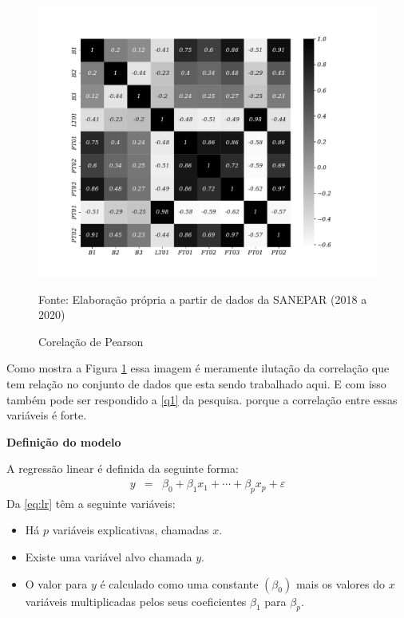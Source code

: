 \begin{figure}[H]
	\centering
	\caption{Corelação de Pearson }
	\label{fig:person}
	\includegraphics[width=1\linewidth]{Apendices/Figuras/modelagem-24h/person}
	
	Fonte: Elaboração própria a partir de dados da SANEPAR (2018 a 2020)
\end{figure}

Como mostra a Figura \ref{fig:person} essa imagem é meramente ilutação da correlação que tem relação no conjunto de dados que esta sendo trabalhado aqui. E com isso também pode ser respondido a \ref{q1} da pesquisa. porque a correlação entre essas variáveis é forte.

\textbf{Definição do modelo}

A regressão linear é definida da seguinte forma:
\begin{eqnarray}
y&=&\beta_0+\beta_1 x_1+\cdots+\beta_p x_p+\varepsilon\label{eq:lr}
\end{eqnarray}
Da \eqref{eq:lr} têm a seguinte variáveis:

\begin{itemize}
	\item  Há $p$ variáveis explicativas, chamadas $x$.
\item Existe uma variável alvo chamada $y$.
\item  O valor para $y$ é calculado como uma constante $\left(\beta_0\right)$ mais os valores do $x$ variáveis multiplicadas pelos seus coeficientes $\beta_1$ para $\beta_p$.
\end{itemize}

